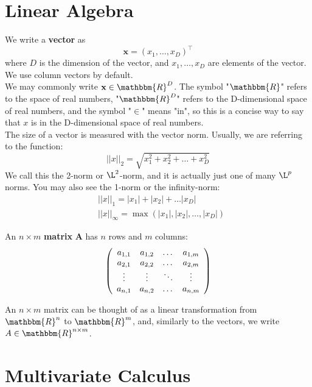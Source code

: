 \documentclass[12pt,letterpaper]{article}
\newcommand{\R}{\mathbbm{R}}
\newcommand{\trans}{\intercal}
\begin{document}
\section{Linear Algebra}

We write a {\bf{vector}} as
$$  \mathbf{x} = (x_1, \dots, x_D)^\top $$
where $D$ is the dimension of the vector, and $x_1, \ldots, x_D$ are elements of the vector. We use column vectors by default. \\

\noindent We may commonly write $\mathbf{x} \in \R^D$. The symbol "$\R$" refers to the space of real numbers, "$\R^D$" refers to the D-dimensional space of real numbers, and the symbol "$\in$" means "in", so this is a concise way to say that $x$ is in the D-dimensional space of real numbers. \\

\noindent The size of a vector is measured with the vector norm. Usually, we are referring to the function:
\[
||x||_2 = \sqrt{x_1^2 + x_2^2 + \dots + x_D^2}
\]
We call this the 2-norm or $\L^2$-norm, and it is actually just one of many $\L^p$ norms. You may also see the 1-norm or the infinity-norm:
\begin{align*}
&||x||_1 = |x_1| + |x_2| + \dots |x_D| \\
&||x||_{\infty} = \max (|x_1|, |x_2|, \dots, |x_D|)
\end{align*}

\noindent An $n \times m$ {\bf{matrix}} $\mathbf{A}$ has $n$ rows and $m$ columns:
\[
\left(\begin{array}{c c c c}
a_{1, 1} & a_{1, 2} & \dots & a_{1, m} \\
a_{2, 1} & a_{2, 2} & \dots & a_{2, m} \\
\vdots & \vdots & \ddots & \vdots \\
a_{n, 1} & a_{n, 2} & \dots & a_{n, m} \\
\end{array}\right)
\]

\noindent An $n \times m$ matrix can be thought of as a linear transformation from $\R^n$ to $\R^m$, and, similarly to the vectors, we write $A \in \R^{n \times m}$.


\section{Multivariate Calculus}
\end{document}
